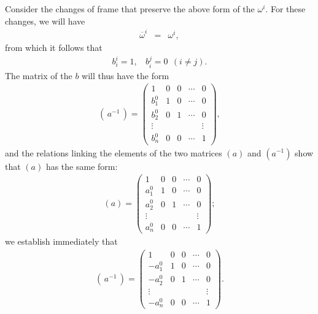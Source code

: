 Consider the changes of frame that preserve the above form
of the $\omega^i$. For these changes, we will have
\begin{eqnarray*}
\overline \omega^i &=& \omega^i ,
\end{eqnarray*}
from which it follows that 
\begin{eqnarray*}
b^i_i = 1, \ \ \ \ b^j_i = 0\ \ (i\neq j).
\end{eqnarray*}
The matrix of the $b$ will thus have the form
\begin{eqnarray*}
(\, a^{-1} \,) = \left(
\begin{array}{ccccc}
1 & 0  & 0 & \cdots & 0 \\
b^0_1 &  1 & 0 & \cdots & 0 \\
b^0_2 &  0 & 1 & \cdots & 0 \\
\vdots &  &  &  & \vdots \\
b^0_n &  0  &  0  & \cdots & 1 
\end{array}
\right), 
\end{eqnarray*}
and the relations linking the elements of the two matrices $(a)$ and $(a^{-1})$ show that $(a)$ has the same form:
\begin{eqnarray*}
( a) = \left(
\begin{array}{ccccc}
1 & 0  & 0 & \cdots & 0 \\
a^0_1 &  1 & 0 & \cdots & 0 \\
a^0_2 &  0 & 1 & \cdots & 0 \\
\vdots &  &  &  & \vdots \\
a^0_n &  0  &  0  & \cdots & 1 
\end{array}
\right); 
\end{eqnarray*}
we establish immediately that 
\begin{eqnarray*}
(\, a^{-1} \,) = \left(
\begin{array}{ccccc}
1 & 0  & 0 & \cdots & 0 \\
- a^0_1 &  1 & 0 & \cdots & 0 \\
- a^0_2 &  0 & 1 & \cdots & 0 \\
\vdots &  &  &  & \vdots \\
- a^0_n &  0  &  0  & \cdots & 1 
\end{array}
\right). 
\end{eqnarray*}

